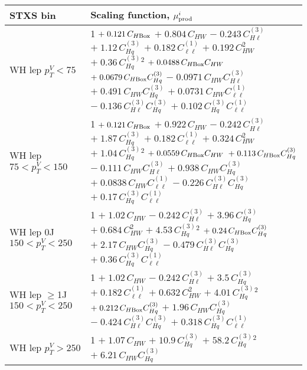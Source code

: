 \begin{tabular}{l|p{}}
    \hline
    STXS bin & Scaling function, $\mu^i_{\rm{prod}}$ \\ \hline
    WH lep $p_{T}^{V} < 75$ & 1 $+\;0.121\,C_{H\rm{Box}}$ $+\;0.804\,C_{HW}$ $-\;0.243\,C^{(3)}_{H\ell}$ $+\;1.12\,C^{(3)}_{Hq}$ $+\;0.182\,C^{(1)}_{\ell\ell}$ $+\;0.192\,C_{HW}^{2}$ $+\;0.36\,C^{(3)}_{Hq}^{2}$ $+\;0.0488\,C_{H\rm{Box}}C_{HW}$ $+\;0.0679\,C_{H\rm{Box}}C^{(3)}_{Hq}$ $-\;0.0971\,C_{HW}C^{(3)}_{H\ell}$ $+\;0.491\,C_{HW}C^{(3)}_{Hq}$ $+\;0.0731\,C_{HW}C^{(1)}_{\ell\ell}$ $-\;0.136\,C^{(3)}_{H\ell}C^{(3)}_{Hq}$ $+\;0.102\,C^{(3)}_{Hq}C^{(1)}_{\ell\ell}$ \\
    WH lep $75 < p_{T}^{V} < 150$ & 1 $+\;0.121\,C_{H\rm{Box}}$ $+\;0.922\,C_{HW}$ $-\;0.242\,C^{(3)}_{H\ell}$ $+\;1.87\,C^{(3)}_{Hq}$ $+\;0.182\,C^{(1)}_{\ell\ell}$ $+\;0.324\,C_{HW}^{2}$ $+\;1.04\,C^{(3)}_{Hq}^{2}$ $+\;0.0559\,C_{H\rm{Box}}C_{HW}$ $+\;0.113\,C_{H\rm{Box}}C^{(3)}_{Hq}$ $-\;0.111\,C_{HW}C^{(3)}_{H\ell}$ $+\;0.938\,C_{HW}C^{(3)}_{Hq}$ $+\;0.0838\,C_{HW}C^{(1)}_{\ell\ell}$ $-\;0.226\,C^{(3)}_{H\ell}C^{(3)}_{Hq}$ $+\;0.17\,C^{(3)}_{Hq}C^{(1)}_{\ell\ell}$ \\
    WH lep 0J $150 < p_{T}^{V} < 250$ & 1 $+\;1.02\,C_{HW}$ $-\;0.242\,C^{(3)}_{H\ell}$ $+\;3.96\,C^{(3)}_{Hq}$ $+\;0.684\,C_{HW}^{2}$ $+\;4.53\,C^{(3)}_{Hq}^{2}$ $+\;0.24\,C_{H\rm{Box}}C^{(3)}_{Hq}$ $+\;2.17\,C_{HW}C^{(3)}_{Hq}$ $-\;0.479\,C^{(3)}_{H\ell}C^{(3)}_{Hq}$ $+\;0.36\,C^{(3)}_{Hq}C^{(1)}_{\ell\ell}$ \\
    WH lep $\geq$1J $150 < p_{T}^{V} < 250$ & 1 $+\;1.02\,C_{HW}$ $-\;0.242\,C^{(3)}_{H\ell}$ $+\;3.5\,C^{(3)}_{Hq}$ $+\;0.182\,C^{(1)}_{\ell\ell}$ $+\;0.632\,C_{HW}^{2}$ $+\;4.01\,C^{(3)}_{Hq}^{2}$ $+\;0.212\,C_{H\rm{Box}}C^{(3)}_{Hq}$ $+\;1.96\,C_{HW}C^{(3)}_{Hq}$ $-\;0.424\,C^{(3)}_{H\ell}C^{(3)}_{Hq}$ $+\;0.318\,C^{(3)}_{Hq}C^{(1)}_{\ell\ell}$ \\
    WH lep $p_{T}^{V} > 250$ & 1 $+\;1.07\,C_{HW}$ $+\;10.9\,C^{(3)}_{Hq}$ $+\;58.2\,C^{(3)}_{Hq}^{2}$ $+\;6.21\,C_{HW}C^{(3)}_{Hq}$ \\
    \hline

\end{tabular}
